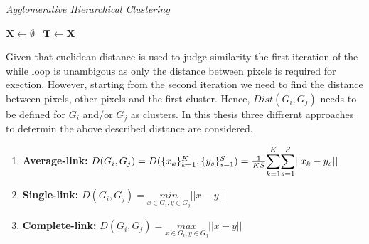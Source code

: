 \documentclass[aodsor,preprint]{imsart}
\numberwithin{equation}{section}
\theoremstyle{plain}
\begin{document}
{}
\begin{algorithm}[hbt!]
	\caption{\textit{Agglomerative Hierarchical Clustering}}\label{alg:one}
	$\mathbf{X} \gets \emptyset$\ 
	$\mathbf{T} \gets \mathbf{X}$
\end{algorithm}

Given that euclidean distance is used to judge similarity the first iteration of the while loop is unambigous as only the distance between pixels is required for exection. However, starting from the second iteration we need to find the distance between pixels, other pixels and the first cluster. Hence, $Dist(G_i, G_j)$ needs to be defined for $G_i$ and/or $G_j$ as clusters. In this thesis three diffrernt approaches to determin the above described distance are considered.

\begin{enumerate}
	\item \textbf{Average-link:} $D(G_i, G_j) = D(\{x_k\}_{k = 1}^K, \{y_s\}_{s = 1}^S) = \frac{1}{KS} \mathlarger{\sum}_{k = 1}^K \mathlarger{\sum}_{s = 1}^S \lvert\lvert x_k - y_s\rvert \rvert$
	
	\item \textbf{Single-link:} $D(G_i, G_j) = \underset{x \in G_i, y \in G_j}{min} \lvert \lvert x - y\rvert \rvert$
	
	\item \textbf{Complete-link:} $D(G_i, G_j) = \underset{x \in G_i, y \in G_j}{max} \lvert \lvert x - y\rvert \rvert$
\end{enumerate}
\end{document}

